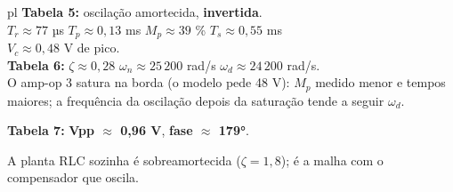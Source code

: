 \documentclass[10pt]{article}
\begin{document}
\begin{minipage}[t]{0.4\linewidth}
\begin{caixa}{pl}
\textbf{Tabela 5:} oscilação amortecida, \textbf{invertida}.\\
$T_r \approx 77$ µs \quad $T_p \approx 0{,}13$ ms \quad $M_p \approx 39$ \% \quad $T_s \approx 0{,}55$ ms\\
$V_c \approx 0{,}48$ V de pico.\\
\textbf{Tabela 6:} $\zeta \approx 0{,}28$ \quad $\omega_n \approx 25\,200$ rad/s \quad $\omega_d \approx 24\,200$ rad/s.\\
\footnotesize O amp-op 3 satura na borda (o modelo pede 48 V): $M_p$ medido menor e tempos maiores;
a frequência da oscilação depois da saturação tende a seguir $\omega_d$.\normalsize

\smallskip
\textbf{Tabela 7:} \textbf{Vpp $\approx$ 0,96 V}, \textbf{fase $\approx$ 179°}.

\smallskip\footnotesize A planta RLC sozinha é sobreamortecida ($\zeta = 1{,}8$); é a malha com o compensador que oscila.
\end{caixa}
\end{minipage}
\end{document}

